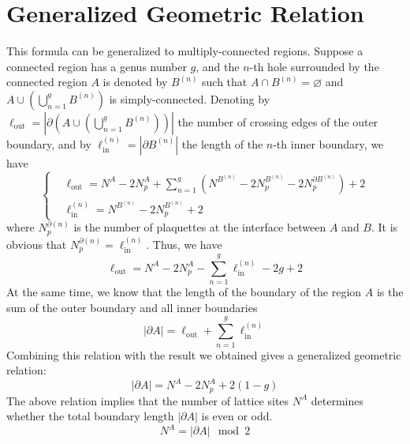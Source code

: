 \documentclass[12font]{article}
\theoremstyle{definition}
\newcommand{\lr}[1]{\left(  #1  \right)}
\newcommand{\abs}[1]{\left|  #1  \right|}
\newcommand{\de}{\partial}
\newcommand{\mrm}[1]{\mathrm{#1}}
\begin{document}
\appendix

\section{Generalized Geometric Relation}
This formula can be generalized to multiply-connected regions. Suppose a connected region has a genus number $g$, and the $n$-th hole surrounded by the connected region $A$ is denoted by $B^{(n)}$ such that $A\cap B^{(n)}=\varnothing$ and $A\cup \lr{\bigcup_{n=1}^{g} B^{(n)}}$ is simply-connected. Denoting by $\ell_{\mrm{out}} = \abs{\de\lr{A\cup \lr{\bigcup_{n=1}^{g} B^{(n)}}}}$ the number of crossing edges of the outer boundary, and by $\ell_{\mrm{in}}^{(n)}=\abs{\de B^{(n)}}$ the length of the $n$-th inner boundary, we have
\[
\left\{
\begin{aligned}
&\ell_{\mrm{out}} = N^A- 2N^A_{p} + \sum_{n=1}^{g}\lr{N^{B^{(n)}} -2N^{B^{(n)}}_{p} - 2N^{\de B^{(n)}}_{p}} +2 \\
&\ell_{\mrm{in}}^{(n)} = N^{B^{(n)}} -2N^{B^{(n)}}_{p}  +2
\end{aligned}
\right.
\]
where $N^{\de(n)}_p$ is the number of plaquettes at the interface between $A$ and $B$. It is obvious that $N^{\de(n)}_p = \ell_{\mrm{in}}^{(n)}$. Thus, we have
\[
\ell_{\mrm{out}} = N^A- 2N^A_{p} - \sum_{n=1}^{g}\ell_{\mrm{in}}^{(n)} -2g + 2
\]
At the same time, we know that the length of the boundary of the region $A$ is the sum of the outer boundary and all inner boundaries
\[
\abs{\de A} = \ell_{\mrm{out}} + \sum_{n=1}^{g}\ell_{\mrm{in}}^{(n)}
\]
Combining this relation with the result we obtained gives a generalized geometric relation:
\begin{equation}\label{eq:Pick_multi-con}
    \abs{\de A} = N^A-2N^A_p+2(1-g)
\end{equation}
The above relation implies that the number of lattice sites $N^A$ determines whether the total boundary length $\abs{\de A}$ is even or odd. 
\[
N^A = \abs{\de A} \mod 2
\]


\end{document}
